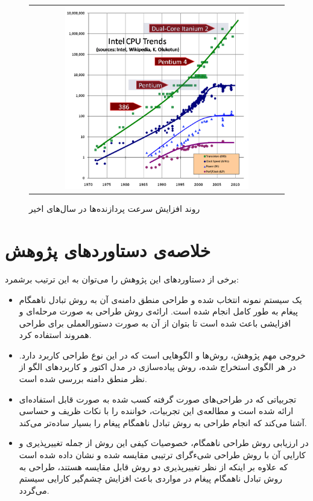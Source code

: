 \begin{figure}
    \begin{center}
    \begin{tabular}{ c }
  	 \includegraphics[width=12cm,height=8cm]{1-Introduction/Figures/Moore.png}
  \end{tabular}
  \end{center}
   \caption{\label{fig:CPU_Trend} روند افزایش سرعت پردازنده‌ها در سال‌های اخیر}
\end{figure}
 

\section{خلاصه‌ی دستاوردهای پژوهش}
برخی از دستاوردهای این پژوهش را می‌توان به این ترتیب برشمرد:
\begin{itemize}
\item  یک سیستم نمونه انتخاب شده و طراحی منطق دامنه‌ی آن به روش تبادل ناهمگام پیغام به طور کامل انجام شده است. ارائه‌ی روش طراحی به صورت مرحله‌ای و افزایشی باعث شده است تا بتوان از آن به صورت دستورالعملی برای طراحی همروند استفاده کرد. 
\item خروجی مهم پژوهش، روش‌ها و الگوهایی است که در این نوع طراحی کاربرد دارد. در هر الگوی استخراج شده، روش پیاده‌سازی در مدل اکتور و کاربردهای الگو از نظر منطق دامنه بررسی شده است. 
\item تجربیاتی که در طراحی‌های صورت گرفته کسب شده به صورت قابل استفاده‌ای ارائه شده است و مطالعه‌ی این تجربیات، خواننده را با نکات ظریف و  حساسی آشنا می‌کند که انجام طراحی به روش تبادل ناهمگام پیغام را بسیار ساده‌تر می‌کند.
\item در ارزیابی روش طراحی ناهمگام، خصوصیات کیفی این روش از جمله تغییرپذیری و کارایی آن با روش طراحی شیءگرای ترتیبی مقایسه شده و نشان داده شده است که علاوه بر اینکه از نظر تغییرپذیری دو روش قابل مقایسه هستند، طراحی به روش تبادل ناهمگام پیغام در مواردی باعث افزایش چشم‌گیر کارایی سیستم می‌گردد.
\end{itemize}
